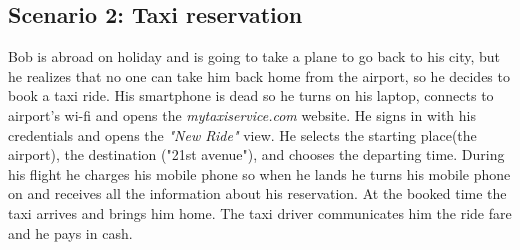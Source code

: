 \subsection{Scenario 2: Taxi reservation}
Bob is abroad on holiday and is going to take a plane to go back to his city, but he realizes that no one can take him back home from the airport, so he decides to book a taxi ride. His smartphone is dead so he turns on his laptop, connects to airport's wi-fi and opens the \textit{mytaxiservice.com} website. He signs in with his credentials and opens the \textit{"New Ride"} view. He selects the starting place(the airport), the destination ("21st avenue"), and chooses the departing time. During his flight he charges his mobile phone so when he lands he turns his mobile phone on and receives all the information about his reservation. At the booked time the taxi arrives and brings him home. The taxi driver communicates him the ride fare and he pays in cash.